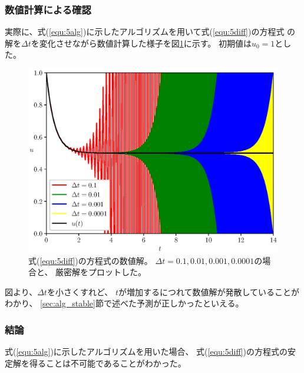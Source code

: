 \documentclass[a4j, titlepage]{jsarticle}
\numberwithin{equation}{section}
\begin{document}
        \subsubsection{数値計算による確認}
            実際に、式(\ref{equ:5alg})に示したアルゴリズムを用いて式(\ref{equ:5diff})の方程式
            の解を$\Delta t$を変化させながら数値計算した様子を図\ref{fig:5}に示す。
            初期値は$u_0 = 1$とした。
            \begin{figure}[h]
                \centering
                \includegraphics[width=0.8\hsize]{kadai5/kadai5.eps}
                \caption{
                    式(\ref{equ:5diff})の方程式の数値解。
                    $\Delta t = 0.1, 0.01, 0.001, 0.0001$の場合と、
                    厳密解をプロットした。
                }
                \label{fig:5}
            \end{figure}

            図より、$\Delta t$を小さくすれど、
            $t$が増加するにつれて数値解が発散していることがわかり、
            \ref{sec:alg_stable}節で述べた予測が正しかったといえる。

        \subsubsection{結論}
            式(\ref{equ:5alg})に示したアルゴリズムを用いた場合、
            式(\ref{equ:5diff})の方程式の安定解を得ることは不可能であることがわかった。
\end{document}
